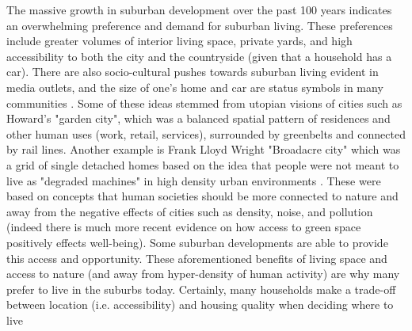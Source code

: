 The massive growth in suburban development over the past 100 years indicates an overwhelming preference and demand for suburban living. These preferences include greater volumes of interior living space, private yards, and high accessibility to both the city and the countryside (given that a household has a car). There are also socio-cultural pushes towards suburban living evident in media outlets, and the size of one's home and car are status symbols in many communities \cite{kunstler_geography_1994}. Some of these ideas stemmed from utopian visions of cities such as Howard's "garden city", which was a balanced spatial pattern of residences and other human uses (work, retail, services), surrounded by greenbelts and connected by rail lines. Another example is Frank Lloyd Wright "Broadacre city" which was a grid of single detached homes based on the idea that people were not meant to live as "degraded machines" in high density urban environments \cite{wegener_land-use_2004}. These were based on concepts that  human societies should be more connected to nature and away from the negative effects of cities such as density, noise, and pollution (indeed there is much more recent evidence on how access to green space positively effects well-being). Some suburban developments are able to provide this access and opportunity. These aforementioned benefits of living space and access to nature (and away from hyper-density of human activity) are why many prefer to live in the suburbs today. Certainly, many households make a trade-off between location (i.e. accessibility) and housing quality when deciding where to live \cite{lee_neighborhood_1994,alonso_location_1964}

